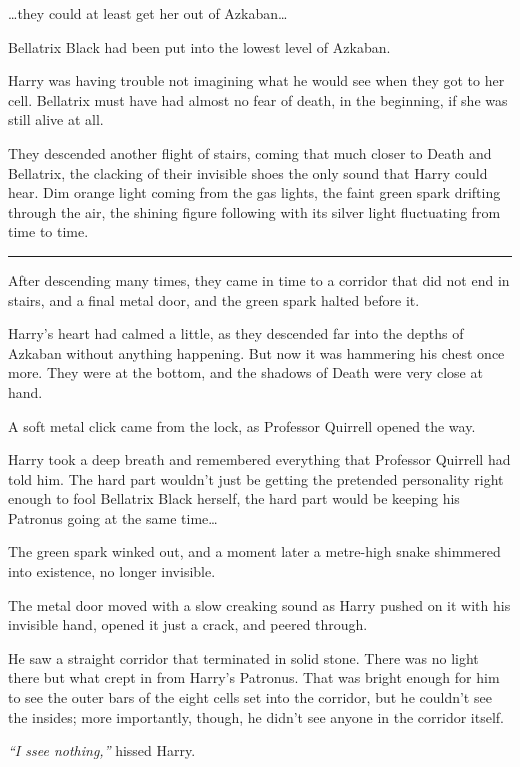 \ldots{}they could at least get her out of Azkaban\ldots{}

Bellatrix Black had been put into the lowest level of Azkaban.

Harry was having trouble not imagining what he would see when they got
to her cell. Bellatrix must have had almost no fear of death, in the
beginning, if she was still alive at all.

They descended another flight of stairs, coming that much closer to
Death and Bellatrix, the clacking of their invisible shoes the only
sound that Harry could hear. Dim orange light coming from the gas
lights, the faint green spark drifting through the air, the shining
figure following with its silver light fluctuating from time to time.

\begin{center}\rule{3in}{0.4pt}\end{center}

After descending many times, they came in time to a corridor that did
not end in stairs, and a final metal door, and the green spark halted
before it.

Harry's heart had calmed a little, as they descended far into the depths
of Azkaban without anything happening. But now it was hammering his
chest once more. They were at the bottom, and the shadows of Death were
very close at hand.

A soft metal click came from the lock, as Professor Quirrell opened the
way.

Harry took a deep breath and remembered everything that Professor
Quirrell had told him. The hard part wouldn't just be getting the
pretended personality right enough to fool Bellatrix Black herself, the
hard part would be keeping his Patronus going at the same time\ldots{}

The green spark winked out, and a moment later a metre-high snake
shimmered into existence, no longer invisible.

The metal door moved with a slow creaking sound as Harry pushed on it
with his invisible hand, opened it just a crack, and peered through.

He saw a straight corridor that terminated in solid stone. There was no
light there but what crept in from Harry's Patronus. That was bright
enough for him to see the outer bars of the eight cells set into the
corridor, but he couldn't see the insides; more importantly, though, he
didn't see anyone in the corridor itself.

\emph{``I ssee nothing,''} hissed Harry.

